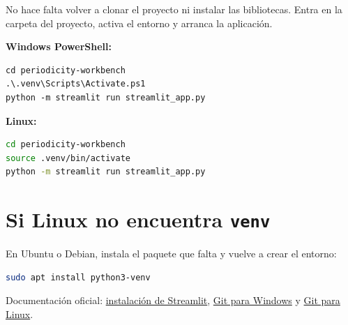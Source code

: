 \documentclass[11pt,a4paper]{article}
\begin{document}
No hace falta volver a clonar el proyecto ni instalar las bibliotecas. Entra en la carpeta del proyecto, activa el entorno y arranca la aplicación.

\textbf{Windows PowerShell:}
\begin{lstlisting}
cd periodicity-workbench
.\.venv\Scripts\Activate.ps1
python -m streamlit run streamlit_app.py
\end{lstlisting}

\textbf{Linux:}
\begin{lstlisting}[language=bash]
cd periodicity-workbench
source .venv/bin/activate
python -m streamlit run streamlit_app.py
\end{lstlisting}

\section*{Si Linux no encuentra \texttt{venv}}

En Ubuntu o Debian, instala el paquete que falta y vuelve a crear el entorno:
\begin{lstlisting}[language=bash]
sudo apt install python3-venv
\end{lstlisting}

\vfill
\noindent\small Documentación oficial: \href{https://docs.streamlit.io/get-started/installation/command-line}{instalación de Streamlit}, \href{https://git-scm.com/install/win}{Git para Windows} y \href{https://git-scm.com/install/linux}{Git para Linux}.
\end{document}

